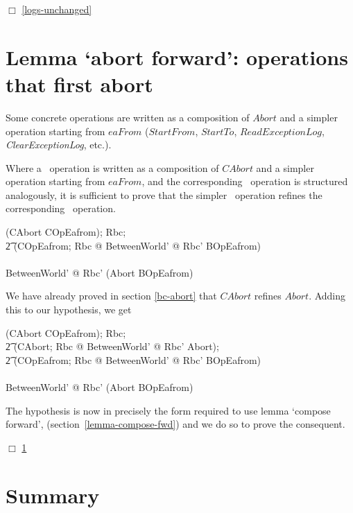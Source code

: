 $\Box$ \ref{logs-unchanged}
\section{Lemma `abort forward': operations that first abort}
\label{ignore-abort-bc-op}
Some concrete operations are written as a composition of $Abort$ and
a simpler operation starting from $eaFrom$ ($StartFrom$, $StartTo$,
$ReadExceptionLog$, {\it ClearExceptionLog}, etc.).

  {\rm Where a \Conc\ operation is written as a composition of
    $CAbort$ and a simpler operation starting from $eaFrom$, and the
    corresponding \Betw\ operation is structured analogously, it is
    sufficient to prove that the simpler \Conc\ operation refines the
    corresponding \Betw\ operation.  }
  \begin{gzed}
  (CAbort \semi COpEafrom); Rbc;
  \\ %
  \t2 (\forall COpEafrom; Rbc @ \exists BetweenWorld' @ Rbc' \land
  BOpEafrom)
  \\ %
  \shows
  \\ %
  \exists BetweenWorld' @ Rbc' \land (Abort \semi BOpEafrom)
  \end{gzed}

 We have already proved in section
\ref{bc-abort} that $CAbort$ refines $Abort$.  Adding this to our
hypothesis, we get
\begin{gzed}
(CAbort \semi COpEafrom); Rbc;
\\ %
\t2 (\forall CAbort; Rbc @ \exists BetweenWorld' @ Rbc' \land
Abort);
\\ %
\t2 (\forall COpEafrom; Rbc @ \exists BetweenWorld' @ Rbc' \land
BOpEafrom)
\\ %
\shows
\\ %
\exists BetweenWorld' @ Rbc' \land (Abort \semi BOpEafrom)
\end{gzed}
The hypothesis is now in precisely the form required to use lemma
`compose forward', (section~\ref{lemma-compose-fwd}) and we do so to
prove the consequent.

$\Box$ \ref{ignore-abort-bc-op}


\newpage
\section{Summary}\label{ch28.summary}

\ldefsummary %
\lthmsummary %
\lthmaddeddefsummary %
\lthmaddedthmsummary %
\lzevessummary %
